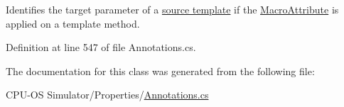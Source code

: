 Identifies the target parameter of a \hyperlink{class_source_template_attribute}{source template} if the \hyperlink{class_macro_attribute}{Macro\+Attribute} is applied on a template method. 



Definition at line 547 of file Annotations.\+cs.



The documentation for this class was generated from the following file\+:\begin{DoxyCompactItemize}
\item 
C\+P\+U-\/\+O\+S Simulator/\+Properties/\hyperlink{_annotations_8cs}{Annotations.\+cs}\end{DoxyCompactItemize}
